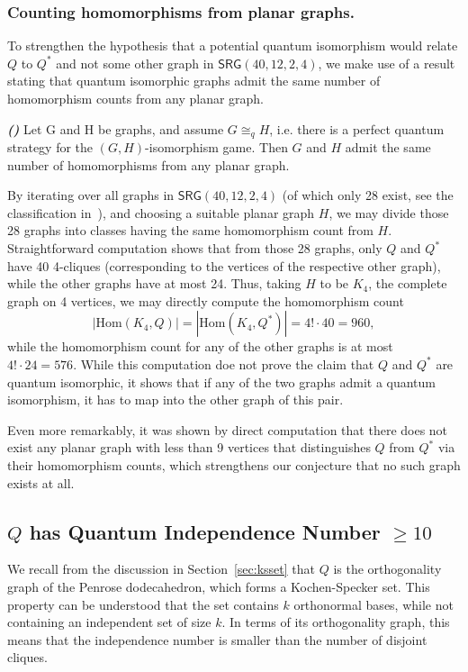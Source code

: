 \subsubsection{Counting homomorphisms from planar graphs.}
To strengthen the hypothesis that
a potential quantum isomorphism would relate $Q$ to $Q^*$ 
and not some other graph in $\textsf{SRG}(40, 12, 2, 4)$,
we make use of a result stating that quantum isomorphic graphs admit
the same number of homomorphism counts from any planar graph.
\begin{theorem}
    \emph{\textbf{(\cite[Theorem 7.16]{mančinska2019quantumisomorphismequivalentequality})}}
    Let G and H be graphs, and assume
    $G \cong_q H$, i.e. there is a perfect quantum strategy for the $(G, H)$-isomorphism game.
    Then $G$ and $H$ admit the same number of homomorphisms from any planar graph.
\end{theorem}
By iterating over all graphs in $\textsf{SRG}(40, 12, 2, 4)$
(of which only 28 exist, see the classification in~\cite{Spence2000}),
and choosing a suitable planar graph $H$, we may divide those
28 graphs into classes having the same homomorphism count from $H$.
%
Straightforward computation shows that from those 28 graphs,
only $Q$ and $Q^*$ have 40 4-cliques
(corresponding to the vertices of the respective other graph),
while the other graphs have at most 24.
Thus, taking $H$ to be $K_4$, the complete graph on 4 vertices,
we may directly compute the homomorphism count
\[ |\textrm{Hom}(K_4, Q)| = |\textrm{Hom}(K_4, Q^*)| = 4! \cdot 40 = 960, \]
while the homomorphism count for any of the other graphs is at most
$4! \cdot 24 = 576$.
While this computation doe not prove the claim
that $Q$ and $Q^*$ are quantum isomorphic, it shows that 
if any of the two graphs admit a quantum isomorphism, it has to 
map into the other graph of this pair.

Even more remarkably, it was shown by direct computation that there does not exist
any planar graph with less than 9 vertices
that distinguishes $Q$ from $Q^*$ via their homomorphism counts, which strengthens 
our conjecture that no such graph exists at all.


\subsection{$Q$ has Quantum Independence Number $\geq 10$}

We recall from the discussion in Section~\ref{sec:ksset} that $Q$ is the orthogonality graph of the Penrose dodecahedron,
which forms a Kochen-Specker set.
This property can be understood that the set contains $k$ orthonormal bases,
while not containing an independent set of size $k$.
In terms of its orthogonality graph, this means that the independence number is smaller
than the number of disjoint cliques.

